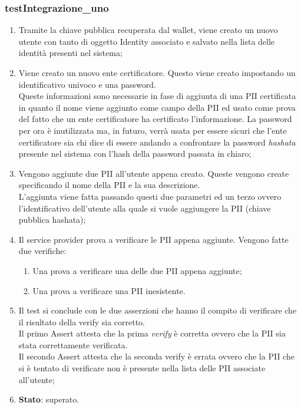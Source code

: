 \subsubsection{testIntegrazione\_uno}
\begin{enumerate}
	\item Tramite la chiave pubblica recuperata dal wallet, viene creato un nuovo utente con tanto di oggetto Identity associato e salvato nella lista delle identità presenti nel sistema;
	\item Viene creato un nuovo ente certificatore. Questo viene creato impostando un identificativo univoco e una password.\\
	Queste informazioni sono necessarie in fase di aggiunta di una \gls{PII} certificata in quanto il nome viene aggiunto come campo della \gls{PII} ed usato come prova del fatto che un ente certificatore ha certificato l'informazione. La password per ora è inutilizzata ma, in futuro, verrà usata per essere sicuri che l'ente certificatore sia chi dice di essere andando a confrontare la password \textit{hashata} presente nel sistema con l'hash della password passata in chiaro;
	\item Vengono aggiunte due \gls{PII} all'utente appena creato. Queste vengono create specificando il nome della \gls{PII} e la sua descrizione.\\
	L'aggiunta viene fatta passando questi due parametri ed un terzo ovvero l'identificativo dell'utente alla quale si vuole aggiungere la \gls{PII} (chiave pubblica hashata);
	\item Il service provider prova a verificare le \gls{PII} appena aggiunte. Vengono fatte due verifiche:
	\begin{enumerate}
		\item Una prova a verificare una delle due \gls{PII} appena aggiunte;
		\item Una prova a verificare una \gls{PII} inesistente.
	\end{enumerate}
	\item Il test si conclude con le due asserzioni che hanno il compito di verificare che il risultato della verify sia corretto.\\
	Il primo Assert attesta che la prima \textit{verify} è corretta ovvero che la \gls{PII} sia stata correttamente verificata.\\
	Il secondo Assert attesta che la seconda verify è errata ovvero che la \gls{PII} che si è tentato di verificare non è presente nella lista delle PII associate all'utente;
	\item \textbf{Stato}: superato.
\end{enumerate}
